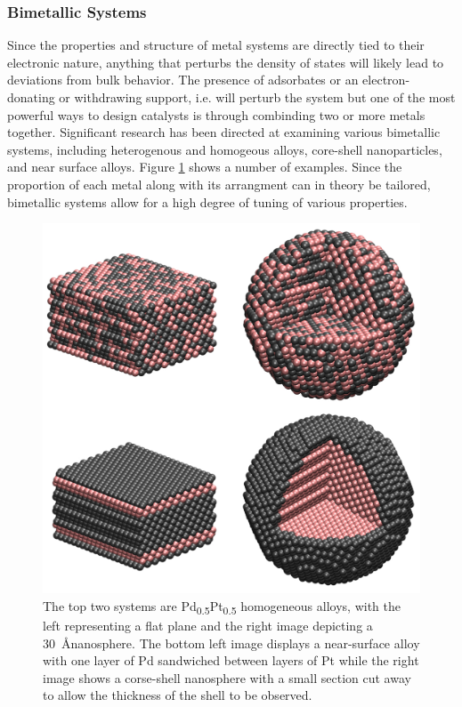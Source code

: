 \subsubsection{Bimetallic Systems}
Since the properties and structure of metal systems are directly tied to their
electronic nature, anything that perturbs the density of states will likely
lead to deviations from bulk behavior. The presence of adsorbates or an
electron-donating or withdrawing support, i.e.  will perturb the
system but one of the most powerful ways to design catalysts is through
combinding two or more metals together. Significant research has been directed
at examining various bimetallic systems, including heterogenous and homogeous
alloys, core-shell nanoparticles, and near surface alloys. Figure
\ref{fig:bimetallic} shows a number of examples. Since the proportion of each
metal along with its arrangment can in theory be tailored, bimetallic systems
allow for a high degree of tuning of various properties.

\begin{figure}
  \includegraphics[width=\linewidth]{../figures/chap1/bimetallic.pdf}
  \caption{The top two systems are Pd\textsubscript{0.5}Pt\textsubscript{0.5}
homogeneous alloys, with the left representing a flat plane and the right image
depicting a 30~\AA nanosphere. The bottom left image displays a near-surface
alloy with one layer of Pd sandwiched between layers of Pt while the right
image shows a corse-shell nanosphere with a small section cut away to allow the
thickness of the shell to be observed.}
\label{fig:bimetallic}
\end{figure}

